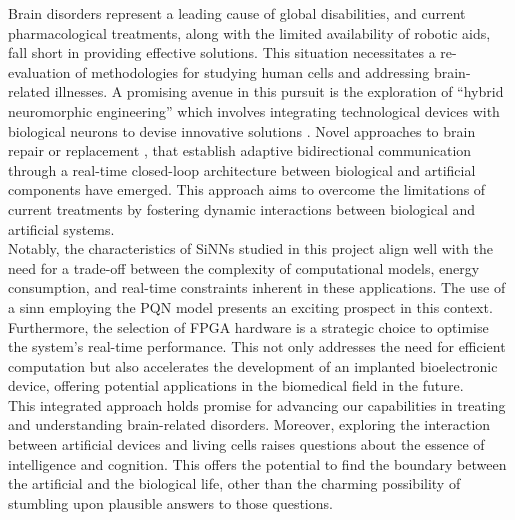 Brain disorders represent a leading cause of global disabilities, 
and current pharmacological treatments, along with the limited availability 
of robotic aids, fall short in providing effective solutions. This situation 
necessitates a re-evaluation of methodologies for studying human cells and addressing 
brain-related illnesses. A promising avenue in this pursuit is the exploration of 
\enquote{hybrid neuromorphic engineering} which involves integrating technological devices 
with biological neurons to devise innovative solutions \cite{Khoyratee}. Novel 
approaches to brain repair \cite{BUCCELLI} or replacement \cite{Jung,Ambroise}, 
that establish adaptive bidirectional communication through a real-time 
closed-loop architecture between biological and artificial components have 
emerged. This approach aims to overcome the limitations of current treatments 
by fostering dynamic interactions between biological and artificial systems.\\ 
Notably, the characteristics of SiNNs studied in this project align well with the 
need for a trade-off between the complexity of computational models, energy 
consumption, and real-time constraints inherent in these applications. The use 
of a \acrshort{sinn} employing the PQN model presents an exciting prospect in this context. 
Furthermore, the selection of FPGA hardware is a strategic choice to optimise the 
system's real-time performance. This not only addresses the need for efficient computation but 
also accelerates the development of an implanted bioelectronic device, offering potential 
applications in the biomedical field in the future.\\

This integrated approach holds promise for advancing our capabilities in treating 
and understanding brain-related disorders. Moreover,
exploring the interaction between artificial devices and living cells raises 
questions about the essence of intelligence and cognition. This offers the potential 
to find the boundary between the artificial and the biological life, other than the 
charming possibility of stumbling upon plausible answers to those questions.\\